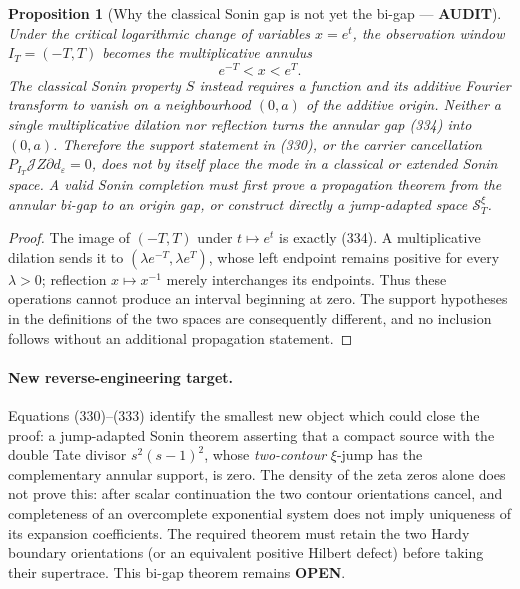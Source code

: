 \documentclass[11pt]{article}
\newtheorem{proposition}[theorem]{Proposition}
\newcommand{\OPEN}{\textcolor{red!70!black}{\textbf{OPEN}}}
\newcommand{\AUDIT}{\textcolor{orange!75!black}{\textbf{AUDIT}}}
\begin{document}
\begin{proposition}[Why the classical Sonin gap is not yet the bi-gap ---
\AUDIT]
Under the critical logarithmic change of variables $x=e^t$, the observation
window $I_T=(-T,T)$ becomes the multiplicative annulus
\begin{equation}
             e^{-T}<x<e^T.                          \tag{334}
\end{equation}
The classical Sonin property $S$ instead requires a function and its
additive Fourier transform to vanish on a neighbourhood $(0,a)$ of the
additive origin.  Neither a single multiplicative dilation nor reflection
turns the annular gap (334) into $(0,a)$.  Therefore the support statement
in (330), or the carrier cancellation
$P_{I_T}\mathscr JZ\partial d_\varepsilon=0$, does not by itself place the
mode in a classical or extended Sonin space.  A valid Sonin completion must
first prove a propagation theorem from the annular bi-gap to an origin gap,
or construct directly a jump-adapted space $\mathscr S_T^\xi$.
\end{proposition}

\begin{proof}
The image of $(-T,T)$ under $t\mapsto e^t$ is exactly (334).  A
multiplicative dilation sends it to $(\lambda e^{-T},\lambda e^T)$, whose
left endpoint remains positive for every $\lambda>0$; reflection
$x\mapsto x^{-1}$ merely interchanges its endpoints.  Thus these operations
cannot produce an interval beginning at zero.  The support hypotheses in
the definitions of the two spaces are consequently different, and no
inclusion follows without an additional propagation statement.
\end{proof}

\paragraph{New reverse-engineering target.}
Equations (330)--(333) identify the smallest new object which could close
the proof: a jump-adapted Sonin theorem asserting that a compact source with
the double Tate divisor $s^2(s-1)^2$, whose \emph{two-contour} $\xi$-jump
has the complementary annular support, is zero.  The density of the zeta
zeros alone does not prove this: after scalar continuation the two contour
orientations cancel, and completeness of an overcomplete exponential
system does not imply uniqueness of its expansion coefficients.  The
required theorem must retain the two Hardy boundary orientations (or an
equivalent positive Hilbert defect) before taking their supertrace.  This
bi-gap theorem remains \OPEN{}.
\end{document}
